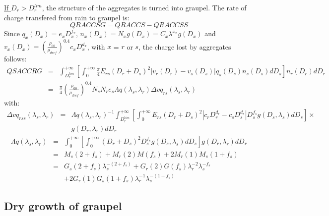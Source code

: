 \noindent
\underline{If $D_r > D_{r} ^{lim}$}, the structure of the aggregates is turned into graupel.
The rate of charge transfered from rain to graupel is:
\begin{equation}
  QRACCSG = QRACCS - QRACCSS
\end{equation}
Since $q_x (D_x) = e_x D_x ^{f_x}$, $n_x (D_x) = N_x g(D_x) = C_x \lambda ^{x_x} g(D_x)$ and $v_{x}(D_x) =  \left( \frac{\rho _{00}}{\rho _{dref}} \right)^{0.4} c_x D_x ^{d_x}$, with $x$ = $r$ or $s$, the charge lost by aggregates follows:
\begin{eqnarray}
  QSACCRG &=& \int_{D_r ^{lim}} ^{+ \infty} \left[ \int_0 ^{+ \infty} 
              \frac{\pi}{4} E_{rs} (D_r + D_s)^2 |v_r (D_r) - v_s (D_s)|
              q_s (D_s) n_s (D_s) dD_s \right] n_r (D_r) dD_r \nonumber \\
          &=& \frac{\pi}{4} 
              \left( \frac{\rho _{00}}{\rho _{dref}} \right)^{0.4}
              N_s N_r e_s
              \Lambda q(\lambda _s, \lambda _r)
              \Delta vq_{rs}(\lambda _s, \lambda _r)
\end{eqnarray}
with:
\begin{eqnarray}
  \Delta vq_{rss}(\lambda _s, \lambda _r) & = &
    \Lambda q(\lambda _s, \lambda _r)^{-1} \int_{D_r ^{lim}} ^{+ \infty}
    \left[ \int_0 ^{+ \infty}  E_{rs} (D_r + D_s)^2 
       |c_r D_r ^{d_r} - c_s D_s ^{d_s}| D_s ^{f_s}  g(D_s , \lambda _s) dD_s
       \right] \times \nonumber \\
       &  & g(D_r , \lambda _r)dD_r 
\end{eqnarray}
\begin{eqnarray}
  \Lambda q(\lambda _s, \lambda _r) &=& \int_0 ^{+ \infty} \left[ 
    \int_0 ^{+ \infty} (D_r + D_s)^2 D_s ^{f_s} g(D_s , \lambda _s) dD_s
    \right] g(D_r , \lambda _r) dD_r \nonumber \\
   &=& M_s(2 + f_s) + M_r(2)M(f_s) + 2 M_r(1) M_s(1 + f_s) \nonumber \\
   &=& G_s(2 + f_s) \lambda _s ^{-(2 + f_s)} + G_r(2) G(f_s) \lambda _r ^{-2} 
       \lambda _s ^{-f_s} \nonumber \\
   & & + 2 G_r(1) G_s(1 + f_s) \lambda _r ^{-1} 
       \lambda _s ^{-(1+ f_s)}
\end{eqnarray}

\subsection{Dry growth of graupel}

